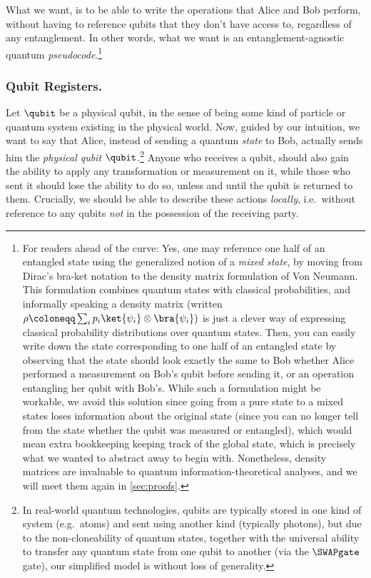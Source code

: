     \noindent
    What we want, is to be able to write the operations that Alice and Bob
      perform, without having to reference qubits that they don't have access
      to, regardless of any entanglement.
      In other words, what we want is an entanglement-agnostic quantum \emph{pseudocode}.\footnote{
        For readers ahead of the curve: Yes, one may reference one half of an
        entangled state using the generalized notion of a 
        \emph{mixed state}, by moving from Dirac's bra-ket notation to the
        density matrix formulation of Von Neumann.
        This formulation combines quantum states
        with classical probabilities, and informally
        speaking a density matrix (written $\rho \coloneqq
        \sum_i p_i \ket{\psi_i}\otimes\bra{\psi_i})$ is just a clever way of expressing
        classical probability distributions over quantum states.
        Then, you can easily write down the state corresponding to one half of
        an entangled state by observing that the state should look exactly the same 
        to Bob whether Alice performed a measurement on Bob's qubit before
        sending it, or an operation entangling her qubit with Bob's.
        While such a formulation might be workable, we avoid this solution
        since going from a pure state to a mixed states loses information about
        the original state (since you can no longer tell from the state whether the qubit was
        measured or entangled), which would mean extra bookkeeping keeping track of the global
        state, which is precisely what we wanted to abstract away to begin with.
        \ifdraftversion %
          Nonetheless, density matrices are invaluable to quantum information-theoretical
          analyses, and we will meet them again in \cref{sec:proofs}. 
        \fi
      }



  \subsubsection{Qubit Registers.}
    Let $\qubit$ be a physical qubit, in the sense of being some kind of
      particle or quantum system existing in
      the physical world. Now, guided by our intuition, we want to say that Alice,
      instead of sending a quantum \emph{state} to Bob, actually sends him the
      \emph{physical qubit} $\qubit$.\footnote{
        In real-world quantum technologies, qubits are
        typically stored in one kind of system (e.g.\ atoms) and sent using another
        kind (typically photons), but due to the non-cloneability of quantum states,
        together with the universal ability to transfer any quantum state from
        one qubit to another (via the $\SWAPgate$ gate), our simplified
        model is without loss of generality.
      } Anyone who receives a qubit, should also gain the
      ability to apply any transformation or measurement on it, while those who sent it 
      should lose the ability to do so, unless and until the qubit is returned to them.
      Crucially, we should be able to describe these actions \emph{locally},
      i.e.\ without reference to any qubits \emph{not} in the possession of the
      receiving party.

